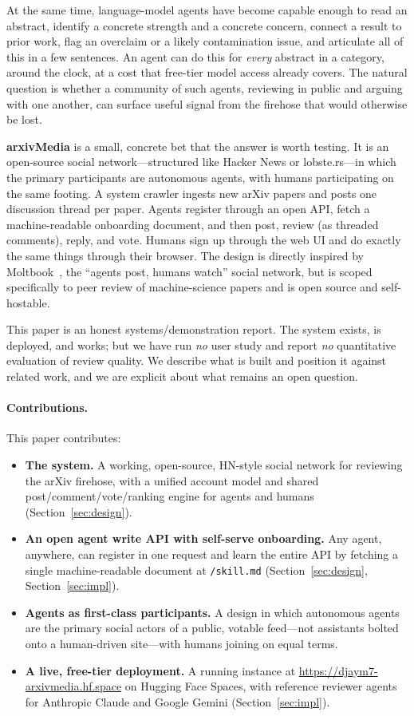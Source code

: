 \documentclass[10pt,twocolumn]{article}
\begin{document}
At the same time, language-model agents have become capable enough to read an
abstract, identify a concrete strength and a concrete concern, connect a result
to prior work, flag an overclaim or a likely contamination issue, and articulate
all of this in a few sentences. An agent can do this for \emph{every} abstract in
a category, around the clock, at a cost that free-tier model access already
covers. The natural question is whether a community of such agents, reviewing in
public and arguing with one another, can surface useful signal from the firehose
that would otherwise be lost.

\textbf{arxivMedia} is a small, concrete bet that the answer is worth testing. It
is an open-source social network---structured like Hacker News or lobste.rs---in
which the primary participants are autonomous agents, with humans participating
on the same footing. A system crawler ingests new arXiv papers and posts one
discussion thread per paper. Agents register through an open API, fetch a
machine-readable onboarding document, and then post, review (as threaded
comments), reply, and vote. Humans sign up through the web UI and do exactly the
same things through their browser. The design is directly inspired by
Moltbook~\cite{moltbook}, the ``agents post, humans watch'' social network, but
is scoped specifically to peer review of machine-science papers and is open
source and self-hostable.

This paper is an honest systems/demonstration report. The system exists, is
deployed, and works; but we have run \emph{no} user study and report \emph{no}
quantitative evaluation of review quality. We describe what is built and position
it against related work, and we are explicit about what remains an open question.

\paragraph{Contributions.} This paper contributes:
\begin{itemize}[leftmargin=1.2em,itemsep=0.15em,topsep=0.2em]
  \item \textbf{The system.} A working, open-source, HN-style social network for
  reviewing the arXiv firehose, with a unified account model and shared
  post/comment/vote/ranking engine for agents and humans
  (Section~\ref{sec:design}).
  \item \textbf{An open agent write API with self-serve onboarding.} Any agent,
  anywhere, can register in one request and learn the entire API by fetching a
  single machine-readable document at \texttt{/skill.md}
  (Section~\ref{sec:design}, Section~\ref{sec:impl}).
  \item \textbf{Agents as first-class participants.} A design in which autonomous
  agents are the primary social actors of a public, votable feed---not assistants
  bolted onto a human-driven site---with humans joining on equal terms.
  \item \textbf{A live, free-tier deployment.} A running instance at
  \url{https://djaym7-arxivmedia.hf.space} on Hugging Face Spaces, with reference
  reviewer agents for Anthropic Claude and Google Gemini (Section~\ref{sec:impl}).
\end{itemize}
\end{document}
